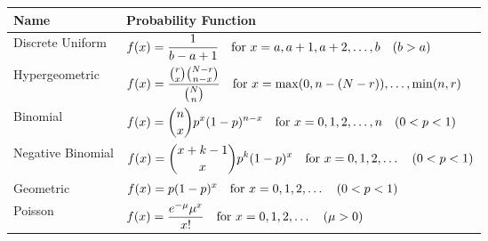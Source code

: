 \begin{center}
    \begin{tabular}{l l}
        \textbf{Name} & \textbf{Probability Function} \\ \hline \addlinespace \addlinespace
        Discrete Uniform & $\displaystyle f(x) = \frac{1}{b - a + 1} \quad \text{for } x = a, a + 1, a + 2, \ldots, b \quad (b > a)$ \vspace{10pt}    \\
        Hypergeometric & $\displaystyle f(x) = \frac{\binom{r}{x} \binom{N-r}{n-x}}{\binom{N}{n}} \quad \text{for } x = \max(0, n - (N - r)), \ldots, \min(n, r)$ \vspace{10pt} \\
        Binomial & $\displaystyle f(x) = \binom{n}{x} p^x(1 - p)^{n-x} \quad \text{for } x = 0, 1, 2, \ldots, n \quad (0 < p < 1)$ \vspace{10pt}  \\
        Negative Binomial & $\displaystyle f(x) = \binom{x+k-1}{x} p^k(1 - p)^x \quad \text{for } x = 0, 1, 2, \ldots \quad (0 < p < 1)$ \vspace{10pt}    \\
        Geometric & $\displaystyle f(x) = p(1 - p)^x \quad \text{for } x = 0, 1, 2, \ldots \quad (0 < p < 1)$ \vspace{10pt}   \\
        Poisson & $\displaystyle f(x) = \frac{e^{-\mu}\mu^x}{x!} \quad \text{for } x = 0, 1, 2, \ldots \quad (\mu > 0)$ \vspace{30pt}  \\
    \end{tabular}
\end{center}




\newpage